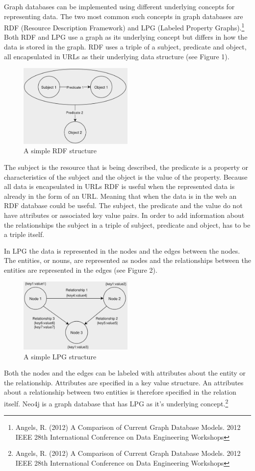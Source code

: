 Graph databases can be implemented using different underlying concepts for representing data. The two most common such concepts in graph databases are RDF (Resource Description Framework) and LPG (Labeled Property Graphs).\footnote{Angels, R. (2012) A Comparison of Current Graph Database Models. 2012 IEEE 28th International Conference on Data Engineering Workshops}
Both RDF and LPG use a graph as its underlying concept but differs in how the data is stored in the graph. RDF uses a triple of a subject, predicate and object, all encapsulated in URLs as their underlying data structure (see Figure 1). 
\begin{figure}[H]
  \centering
  \includegraphics[width=0.5\textwidth]{assets/RDF-example.png}
  \caption{A simple RDF structure}
\end{figure}
The subject is the resource that is being described, the predicate is a property or characteristics of the subject and the object is the value of the property. Because all data is encapsulated in URLs RDF is useful when the represented data is already in the form of an URL. Meaning that when the data is in the web an RDF database could be useful. The subject, the predicate and the value do not have attributes or associated key value pairs. In order to add information about the relationships the subject in a triple of subject, predicate and object, has to be a triple itself. 

In LPG the data is represented in the nodes and the edges between the nodes. The entities, or nouns, are represented as nodes and the relationships between the entities are represented in the edges (see Figure 2). 
\begin{figure}[H]
  \centering
  \includegraphics[width=0.5\textwidth]{assets/LPG-example.png}
  \caption{A simple LPG structure}
\end{figure}
Both the nodes and the edges can be labeled with attributes about the entity or the relationship. Attributes are specified in a key value structure. An attributes about a relationship between two entities is therefore specified in the relation itself. Neo4j is a graph database that has LPG as it's underlying concept.\footnote{Angels, R. (2012) A Comparison of Current Graph Database Models. 2012 IEEE 28th International Conference on Data Engineering Workshops}


